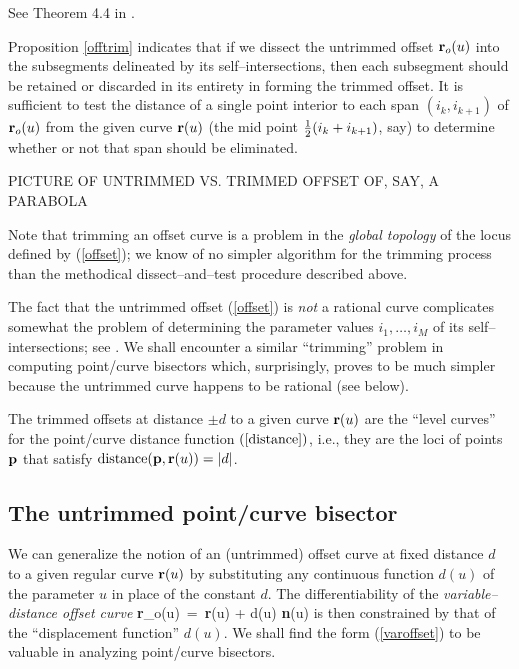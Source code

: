 \prf See Theorem 4.4 in \cite{farouki90a}. \QED

Proposition \ref{offtrim} indicates that if we dissect the
untrimmed offset ${\bf r}_o(u)$ into the subsegments delineated by
its self--intersections, then each subsegment should be retained
or discarded in its entirety in forming the trimmed offset. It is
sufficient to test the distance of a single point interior to each
span $(i_k,i_{k+1})$ of ${\bf r}_o(u)$ from the given curve ${\bf r}
(u)$ (the mid point $\textstyle{1 \over 2}\displaystyle(i_k+i_{k+1})$, say) to determine whether
or not that span should be eliminated.

PICTURE OF UNTRIMMED VS. TRIMMED OFFSET OF, SAY, A PARABOLA

Note that trimming an offset curve is a problem in the {\it global
topology\/} of the locus defined by (\ref{offset}); we know of no
simpler algorithm for the trimming process than the methodical
dissect--and--test procedure described above.

The fact that the untrimmed offset (\ref{offset}) is {\it not\/} a
rational curve complicates somewhat the problem of determining the
parameter values ${i_1,\ldots,i_M}$ of its self--intersections; see
\cite{farouki90b}. We shall encounter a similar ``trimming'' problem
in computing point/curve bisectors which, surprisingly, proves to be
much simpler because the untrimmed curve happens to be rational (see
below).

\begin{rmk}
{\rm
The trimmed offsets at distance $\pm d$ to a given curve ${\bf r}(u)$
are the ``level curves'' for the point/curve distance function $(\ref
{distance})$, i.e., they are the loci of points ${\bf p}$ that satisfy
${\rm distance}({\bf p},{\bf r}(u))=|d|$.
}
\end{rmk}

\subsection{The untrimmed point/curve bisector}
\label{sec:untrim}

We can generalize the notion of an (untrimmed) offset curve at fixed
distance $d$ to a given regular curve ${\bf r}(u)$ by substituting
any continuous function $d(u)$ of the parameter $u$ in place of the
constant $d$. The differentiability of the {\it variable--distance
offset curve}
\be \label{varoffset}
{\bf r}_o(u) \,=\, {\bf r}(u) + d(u) {\bf n}(u)
\ee
is then constrained by that of the ``displacement function'' $d(u)$.
We shall find the form (\ref{varoffset}) to be valuable in analyzing
point/curve bisectors.


